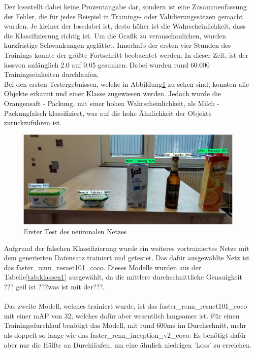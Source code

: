 \documentclass[a4paper,12pt,oneside]{article}
\begin{document}
Der \glqq loss\grqq stellt dabei keine Prozentangabe dar, sondern ist eine Zusammenfassung der Fehler, die für jedes Beispiel in Trainings- oder Validierungssätzen gemacht wurden. Je kleiner der \glqq loss\grqq dabei ist, desto höher ist die Wahrscheinlichkeit, dass die Klassifizierung richtig ist. Um die Grafik zu veranschaulichen, wurden kurzfristige Schwankungen geglättet. Innerhalb der ersten vier Stunden des Trainings konnte der größte Fortschritt beobachtet werden. In dieser Zeit, ist der \glqq loss\grqq von anfänglich 2.0 auf 0.05 gesunken. Dabei wurden rund 60.000 Trainingseinheiten durchlaufen.\\
Bei den ersten Testergebnissen, welche in Abbildung\ref{img:TestNN} zu sehen sind, konnten alle Objekte erkannt und einer Klasse zugewiesen werden. Jedoch wurde die \glqq Orangensaft - Packung\grqq, mit einer hohen Wahrscheinlichkeit, als \glqq Milch - Packung\grqq falsch klassifiziert, was auf die hohe Ähnlichkeit der Objekte zurückzuführen ist.
\\

\begin{figure}
    [h]
	\centering
	\includegraphics[scale=0.3]{Sources/Erster_Test.jpg}
	\caption{Erster Test des neuronalen Netzes}
	\label{img:TestNN}
\end{figure}

Aufgrund der falschen Klassifizierung wurde ein weiteres vortrainiertes Netze mit dem generierten Datensatz trainiert und getestet. Das dafür ausgewählte Netz ist das faster\_rcnn\_resnet101\_coco. Dieses Modelle wurden aus der Tabelle\ref{tab:klassen1} ausgewählt, da die mittlere durchschnittliche Genauigkeit ??? geil ist ???was ist mit der???.
\\
\\
Das zweite Modell, welches trainiert wurde, ist das faster\_rcnn\_resnet101\_coco mit einer mAP von 32, welches dafür aber wesentlich langsamer ist. Für einen Trainingsdurchlauf benötigt das Modell, mit rund 600ms im Durchschnitt, mehr als doppelt so lange wie das faster\_rcnn\_inception\_v2\_coco. Es benötigt dafür aber nur die Hälfte an Durchläufen, um eine ähnlich niedrigen 'Loss' zu erreichen.\\ 
\end{document}
